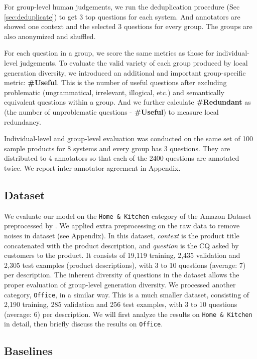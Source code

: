 \documentclass[letterpaper]{article} %
\begin{document}
For group-level human judgements, we run the deduplication procedure (Sec \ref{sec:deduplicate}) to get 3 top questions for each system. And annotators are showed one context and the selected 3 questions for every group. The groups are also anonymized and shuffled.

For each question in a group, we score the same metrics as those for individual-level judgements. To evaluate the valid variety of each group produced by local generation diversity, we introduced an additional and important group-specific metric: \textbf{\#Useful}. This is the number of useful questions after excluding problematic (ungrammatical, irrelevant, illogical, etc.) and semantically equivalent questions within a group. And we further calculate \textbf{\#Redundant} as (the number of unproblematic questions - \textbf{\#Useful}) to measure local redundancy.

Individual-level and group-level evaluation was conducted on the same set of 100 sample products for 8 systems and every group has 3 questions. They are distributed to 4 annotators so that each of the 2400 questions are annotated twice. We report inter-annotator agreement in Appendix.

\subsection{Dataset}
We evaluate our model on the \texttt{Home \& Kitchen} category of the Amazon Dataset preprocessed by \citet{rao2019answer}. We applied extra preprocessing on the raw data to remove noises in dataset (see Appendix). In this dataset, \textit{context} is the product title concatenated with the product description, and \textit{question} is the CQ asked by customers to the product. It consists of 19,119 training, 2,435 validation and 2,305 test examples (product descriptions), with 3 to 10 questions (average: 7) per description. The inherent diversity of questions in the dataset allows the proper evaluation of group-level generation diversity. We processed another category, \texttt{Office}, in a similar way. This is a much smaller dataset, consisting of 2,190 training, 285 validation and 256 test examples, with 3 to 10 questions (average: 6) per description. We will first analyze the results on \texttt{Home \& Kitchen} in detail, then briefly discuss the results on \texttt{Office}.

\subsection{Baselines}
\end{document}
